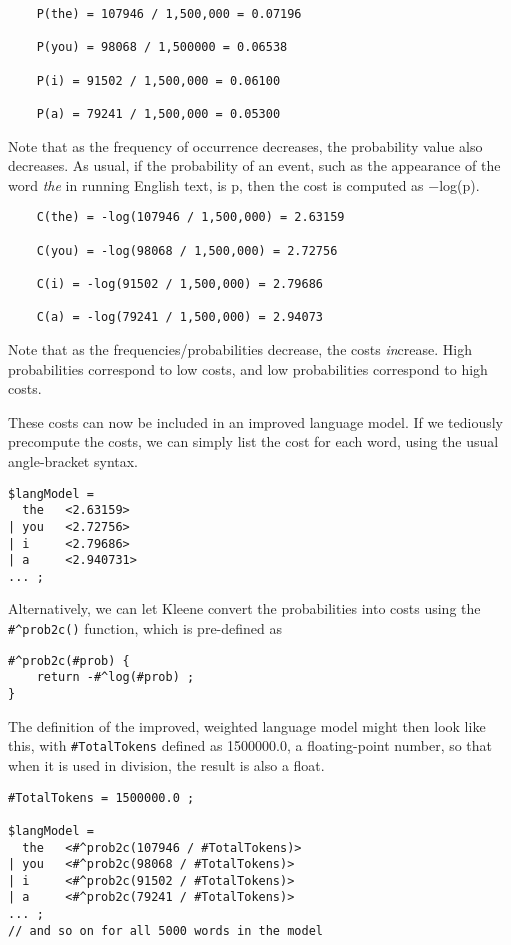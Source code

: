 \begin{Verbatim}
	P(the) = 107946 / 1,500,000 = 0.07196

	P(you) = 98068 / 1,500000 = 0.06538

	P(i) = 91502 / 1,500,000 = 0.06100

	P(a) = 79241 / 1,500,000 = 0.05300
\end{Verbatim}

\noindent
Note that as the frequency of occurrence decreases, the probability value also decreases.  
As usual, if the probability of an event, such as the appearance of the word \emph{the} in
running English text, is p,
then the cost is computed as $-$log(p).

\begin{Verbatim}
	C(the) = -log(107946 / 1,500,000) = 2.63159

	C(you) = -log(98068 / 1,500,000) = 2.72756

	C(i) = -log(91502 / 1,500,000) = 2.79686

	C(a) = -log(79241 / 1,500,000) = 2.94073
\end{Verbatim}

\noindent
Note that as the frequencies/probabilities decrease, the costs \emph{in}crease.
High probabilities correspond to low costs, and low probabilities correspond to
high costs.

These costs can now be included in an improved language model.  If we tediously precompute
the costs, we can simply list the cost for each word, using the usual
angle-bracket syntax.

\begin{Verbatim}
$langModel = 
  the   <2.63159>
| you   <2.72756>
| i     <2.79686>
| a     <2.940731>
... ;
\end{Verbatim}

\noindent
Alternatively, we can let Kleene convert the probabilities into costs using the
\verb!#^prob2c()! function, which is pre-defined as 

\begin{Verbatim}
#^prob2c(#prob) {
    return -#^log(#prob) ;
}
\end{Verbatim}

\noindent
The definition of the improved, weighted language model might then look like this, with
\verb!#TotalTokens! defined as 1500000.0, a floating-point number, so that
when it is used in division, the result is also a float.

\begin{Verbatim}
#TotalTokens = 1500000.0 ;

$langModel = 
  the   <#^prob2c(107946 / #TotalTokens)>
| you   <#^prob2c(98068 / #TotalTokens)>
| i     <#^prob2c(91502 / #TotalTokens)>
| a     <#^prob2c(79241 / #TotalTokens)>
... ;
// and so on for all 5000 words in the model
\end{Verbatim}

